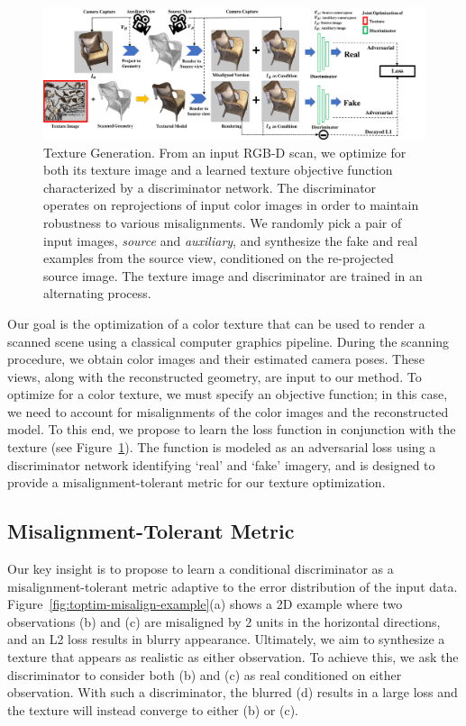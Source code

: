 \begin{figure}
    \centering
    \includegraphics[width=\linewidth]{texturegen/figures/pipeline.png}
    \caption{Texture Generation. 
    From an input RGB-D scan, we optimize for both its texture image and a learned texture objective function characterized by  a discriminator network. 
    The discriminator operates on reprojections of input color images in order to maintain robustness to various misalignments.
    We randomly pick a pair of input images, \emph{source} and \emph{auxiliary}, and synthesize the fake and real examples from the source view, conditioned on the re-projected source image. 
    The texture image and discriminator are trained in an alternating process.}
    \label{fig:toptim-pipeline}
\end{figure}

Our goal is the optimization of a color texture that can be used to render a scanned scene using a classical computer graphics pipeline.
%
During the scanning procedure, we obtain color images and their estimated camera poses.
%
These views, along with the reconstructed geometry, are input to our method.
%
To optimize for a color texture, we must specify an objective function; in this case, we need to account for misalignments of the color images and the reconstructed model.
%
To this end, we propose to learn the loss function in conjunction with the texture (see Figure~\ref{fig:toptim-pipeline}).
%
The function is modeled as an adversarial loss using a discriminator network identifying `real' and `fake' imagery, and is designed to provide a misalignment-tolerant metric for our texture optimization.
%

\subsection{Misalignment-Tolerant Metric}
\label{sec:approach-misalign}



%
Our key insight is to propose to learn a conditional discriminator as a misalignment-tolerant metric adaptive to the error distribution of the input data.
%
Figure~\ref{fig:toptim-misalign-example}(a) shows a 2D example where two observations (b) and (c) are misaligned by 2 units in the horizontal directions, and an L2 loss results in blurry appearance.
%
Ultimately, we aim to synthesize a texture that appears as realistic as either observation.
%
To achieve this, we ask the discriminator to consider both (b) and (c) as real conditioned on either observation.
%
With such a discriminator, the blurred (d) results in a large loss and the texture will instead converge to either (b) or (c).
%

